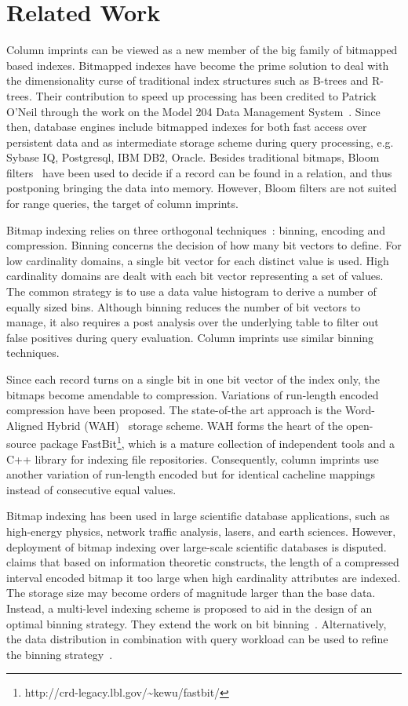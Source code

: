 \section{Related Work}\label{sec:background}
Column imprints can be viewed as a new member of the big family of bitmapped
based indexes. Bitmapped indexes have become the prime solution to deal with
the dimensionality curse of traditional index structures such as B-trees and
R-trees. Their contribution to
speed up processing has been credited to Patrick O'Neil through the work on the
Model 204 Data Management System~\cite{ON87,OG95}. Since then, database engines
include bitmapped indexes for both fast access over persistent data and as
intermediate storage scheme during query processing, e.g. Sybase IQ,
Postgresql, IBM DB2, Oracle. Besides traditional bitmaps, Bloom
filters~\cite{B70} have been used to decide if a record can be found in a
relation, and thus postponing bringing the data into memory. However, Bloom
filters are not suited for range queries, the target of column imprints.

Bitmap indexing relies on three orthogonal techniques~\cite{WOS06}:
binning, encoding and compression. Binning concerns the decision of how many
bit vectors to define. For low cardinality domains, a single bit vector for
each distinct value is used. High cardinality domains are dealt
with each bit vector representing a set of values. The common strategy is to
use a data value histogram to derive a number of equally sized bins. Although
binning reduces the number of bit vectors to manage, it also requires a post
analysis over the underlying table to filter out false positives during query
evaluation. Column imprints use similar binning techniques.

Since each record turns on a single bit in one bit vector of the index only,
the bitmaps become amendable to compression. Variations of run-length encoded
compression have been proposed. The state-of-the art approach is the
Word-Aligned Hybrid (WAH)~\cite{WOS02,WOS08} storage scheme. WAH forms the
heart of the open-source package
FastBit\footnote{http://crd-legacy.lbl.gov/\~{ }kewu/fastbit/}, which
is a mature collection of independent tools and a C++ library for indexing file
repositories. Consequently, column imprints use another variation of
run-length encoded but for identical cacheline mappings instead of consecutive
equal values.

Bitmap indexing has been used in large scientific database applications, such
as high-energy physics, network traffic analysis, lasers, and earth
sciences.
However, deployment of bitmap indexing over large-scale scientific databases is
disputed. \cite{SW07} claims that based on information theoretic constructs,
the length of a compressed interval encoded bitmap it too large when
high cardinality attributes are indexed. The storage size may become orders of
magnitude larger than the base data. Instead, a multi-level indexing scheme is
proposed to aid in the design of an optimal binning strategy. They extend the
work on bit binning~\cite{GS09,WOS04}. Alternatively, the data distribution in
combination with query workload can be used to refine the binning
strategy~\cite{Kou00,CI99}.


